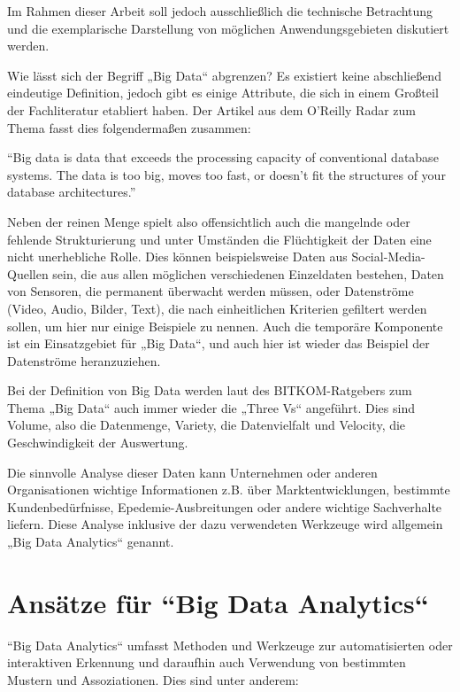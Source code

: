 	Im Rahmen dieser Arbeit soll jedoch ausschließlich die technische Betrachtung und die exemplarische Darstellung von möglichen Anwendungsgebieten diskutiert werden.




Wie lässt sich der Begriff „Big Data“ abgrenzen? Es existiert keine abschließend eindeutige Definition, jedoch gibt es einige Attribute, die sich in einem Großteil der Fachliteratur etabliert haben. Der Artikel aus dem O'Reilly Radar zum Thema  fasst dies folgendermaßen zusammen: 

\enquote{Big data is data that exceeds the processing capacity of conventional database systems. The data is too big, moves too fast, or doesn’t fit the structures of your database architectures.}

Neben der reinen Menge spielt also offensichtlich auch die mangelnde oder fehlende Strukturierung und unter Umständen die Flüchtigkeit der Daten eine nicht unerhebliche Rolle. Dies können beispielsweise Daten aus Social-Media-Quellen sein, die aus allen möglichen verschiedenen Einzeldaten bestehen, Daten von Sensoren, die permanent überwacht werden müssen, oder Datenströme (Video, Audio, Bilder, Text), die nach einheitlichen Kriterien gefiltert werden sollen, um hier nur einige Beispiele zu nennen. Auch die temporäre Komponente ist ein Einsatzgebiet für „Big Data“, und auch hier ist wieder das Beispiel der Datenströme heranzuziehen. 

Bei der Definition von Big Data werden laut des BITKOM-Ratgebers zum Thema „Big Data“  auch immer wieder die „Three Vs“ angeführt. Dies sind Volume, also die Datenmenge, Variety, die Datenvielfalt und Velocity, die Geschwindigkeit der Auswertung. 

Die sinnvolle Analyse dieser Daten kann Unternehmen oder anderen Organisationen wichtige Informationen z.B. über Marktentwicklungen, bestimmte Kundenbedürfnisse, Epedemie-Ausbreitungen oder andere wichtige Sachverhalte liefern. Diese Analyse inklusive der dazu verwendeten Werkzeuge wird allgemein „Big Data Analytics“ genannt. 

\section{Ansätze für ``Big Data Analytics“}
\label{section:ansaetze für ``Big Data Analytics“}


``Big Data Analytics“ umfasst Methoden und Werkzeuge zur automatisierten oder interaktiven Erkennung und daraufhin auch Verwendung von bestimmten Mustern und Assoziationen. Dies sind unter anderem:

